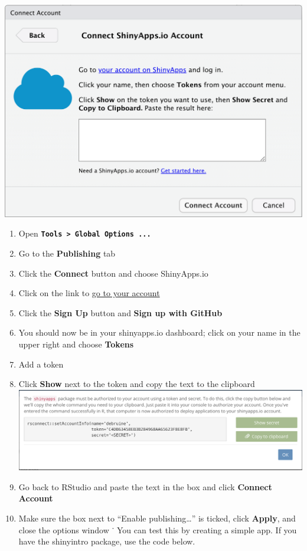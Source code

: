 \documentclass[
]{book}
\providecommand{\tightlist}{%
  \setlength{\itemsep}{0pt}\setlength{\parskip}{0pt}}
\begin{document}
\includegraphics{images/saio_connect.png}

\begin{enumerate}
\def\labelenumi{\arabic{enumi}.}
\tightlist
\item
  Open \textbf{\texttt{Tools\ \textgreater{}\ Global\ Options\ ...}}
\item
  Go to the \textbf{Publishing} tab
\item
  Click the \textbf{Connect} button and choose ShinyApps.io
\item
  Click on the link to \href{https://www.shinyapps.io/}{go to your account}
\item
  Click the \textbf{Sign Up} button and \textbf{Sign up with GitHub}
\item
  You should now be in your shinyapps.io dashboard; click on your name in the upper right and choose \textbf{Tokens}
\item
  Add a token
\item
  Click \textbf{Show} next to the token and copy the text to the clipboard
  \includegraphics{images/saio_secret.png}
\item
  Go back to RStudio and paste the text in the box and click \textbf{Connect Account}
\item
  Make sure the box next to ``Enable publishing\ldots{}'' is ticked, click \textbf{Apply}, and close the options window
  ˙
  You can test this by creating a simple app. If you have the shinyintro package, use the code below.
\end{enumerate}
\end{document}

